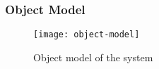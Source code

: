 \subsubsection{Object Model}
\begin{figure}[h]
\centering %
\texttt{[image: object-model]} %
\caption{Object model of the system}
\label{fig: object-model} %
\end{figure}
